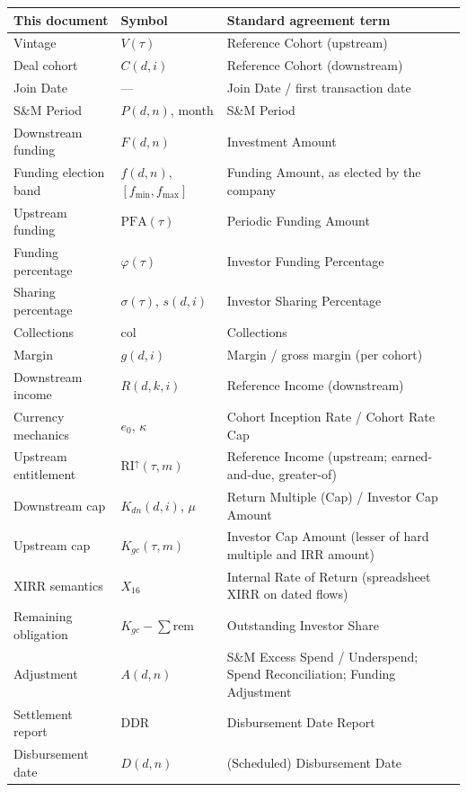 \documentclass[11pt, a4paper]{article}
\theoremstyle{definition}
\newcommand{\PFA}{\mathrm{PFA}}                   %
\newcommand{\RIup}{\mathrm{RI}^{\uparrow}}        %
\newcommand{\rem}{\mathrm{rem}}                   %
\newcommand{\Kgc}{K_{gc}}                         %
\newcommand{\Xirr}{X_{16}}                        %
\newcommand{\col}{\mathrm{col}}                   %
\newcommand{\capdn}{K_{dn}}                       %
\begin{document}
\begin{longtable}{@{} L{4.2cm} L{3.2cm} L{6.8cm} @{}}
\toprule
\textbf{This document} & \textbf{Symbol} & \textbf{Standard agreement term} \\
\midrule
\endhead
Vintage & $V(\tau)$ & Reference Cohort (upstream) \\[3pt]
Deal cohort & $C(d,i)$ & Reference Cohort (downstream) \\[3pt]
Join Date & --- & Join Date / first transaction date \\[3pt]
S\&M Period & $P(d,n)$, month & S\&M Period \\[3pt]
Downstream funding & $F(d,n)$ & Investment Amount \\[3pt]
Funding election band & $f(d,n)$, $[f_{\min}, f_{\max}]$ & Funding Amount, as elected by the company \\[3pt]
Upstream funding & $\PFA(\tau)$ & Periodic Funding Amount \\[3pt]
Funding percentage & $\varphi(\tau)$ & Investor Funding Percentage \\[3pt]
Sharing percentage & $\sigma(\tau)$, $s(d,i)$ & Investor Sharing Percentage \\[3pt]
Collections & $\col$ & Collections \\[3pt]
Margin & $g(d,i)$ & Margin / gross margin (per cohort) \\[3pt]
Downstream income & $R(d,k,i)$ & Reference Income (downstream) \\[3pt]
Currency mechanics & $e_0$, $\kappa$ & Cohort Inception Rate / Cohort Rate Cap \\[3pt]
Upstream entitlement & $\RIup(\tau,m)$ & Reference Income (upstream; earned-and-due, greater-of) \\[3pt]
Downstream cap & $\capdn(d,i)$, $\mu$ & Return Multiple (Cap) / Investor Cap Amount \\[3pt]
Upstream cap & $\Kgc(\tau,m)$ & Investor Cap Amount (lesser of hard multiple and IRR amount) \\[3pt]
XIRR semantics & $\Xirr$ & Internal Rate of Return (spreadsheet XIRR on dated flows) \\[3pt]
Remaining obligation & $\Kgc - \sum \rem$ & Outstanding Investor Share \\[3pt]
Adjustment & $A(d,n)$ & S\&M Excess Spend / Underspend; Spend Reconciliation; Funding Adjustment \\[3pt]
Settlement report & DDR & Disbursement Date Report \\[3pt]
Disbursement date & $D(d,n)$ & (Scheduled) Disbursement Date \\[3pt]

\end{longtable}
\end{document}
